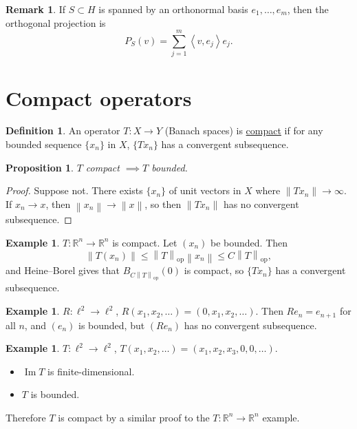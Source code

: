 \documentclass[12pt]{article}
\renewcommand{\Im}{\operatorname{Im}}
\newcommand{\norm}[1]{\left\| #1 \right\|}
\newcommand{\ip}[2]{\left\langle #1, #2 \right\rangle}
\newcommand{\R}{\mathbb{R}}
\newtheorem{prop}[thm]{Proposition}
\theoremstyle{definition}
\newtheorem{defn}[thm]{Definition}
\newtheorem{ex}[thm]{Example}
\newtheorem{rmk}[thm]{Remark}
\begin{document}
\begin{rmk}
	If $S \subset H$ is spanned by an orthonormal basis $e_1, \dots, e_m$, then the orthogonal projection is
	\begin{equation*}
		P_S(v) = \sum_{j=1}^m \ip{v}{e_j} e_j.
	\end{equation*}
\end{rmk}

\section{Compact operators}

\begin{defn}
	An operator $T : X \to Y$ (Banach spaces) is \underline{compact} if for any bounded sequence $\lbrace x_n \rbrace$ in $X$, $\lbrace Tx_n \rbrace$ has a convergent subsequence.
\end{defn}

\begin{prop}
	$T$ compact $\implies T$ bounded.
\end{prop}
\begin{proof}
	Suppose not.
	There exists $\lbrace x_n \rbrace$ of unit vectors in $X$ where $\norm{Tx_n} \to \infty$.
	If $x_n \to x$, then $\norm{x_n} \to \norm{x}$, so then $\norm{Tx_n}$ has no convergent subsequence.
\end{proof}

\begin{ex}
	$T : \R^n \to \R^n$ is compact.
	Let $(x_n)$ be bounded.
	Then
	\begin{equation*}
		\norm{T(x_n)} \leq \norm{T}_{\mathrm{op}} \norm{x_n} \leq C \norm{T}_{\mathrm{op}},
	\end{equation*}
	and Heine--Borel gives that $B_{C\norm{T}_{\mathrm{op}}}(0)$ is compact, so $\lbrace Tx_n \rbrace$ has a convergent subsequence.
\end{ex}

\begin{ex}
	$R : \ell^2 \to \ell^2$, $R(x_1, x_2, \dots) = (0, x_1, x_2, \dots)$.
	Then $Re_n = e_{n+1}$ for all $n$, and $(e_n)$ is bounded, but $(Re_n)$ has no convergent subsequence.
\end{ex}

\begin{ex}
	$T : \ell^2 \to \ell^2$, $T(x_1, x_2, \dots) = (x_1, x_2, x_3, 0, 0, \dots)$.
	\begin{itemize}[nosep]
		\item $\Im T$ is finite-dimensional.
		\item $T$ is bounded.
	\end{itemize}
	Therefore $T$ is compact by a similar proof to the $T : \R^n \to \R^n$ example.
\end{ex}
\end{document}
